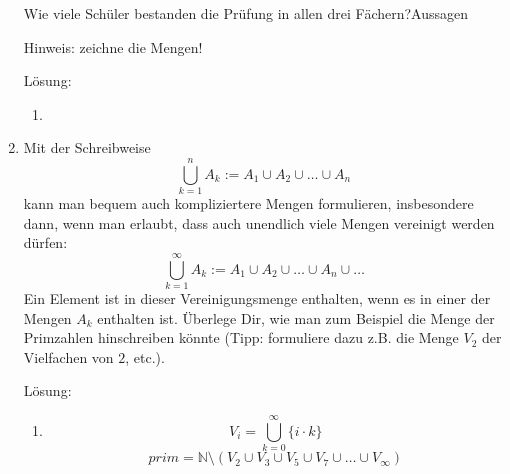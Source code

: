 \documentclass[main.tex]{subfiles}
\begin{document}
\begin{enumerate}
	      Wie viele Schüler bestanden die Prüfung in allen drei Fächern?Aussagen

	      Hinweis: zeichne die Mengen!

	      Lösung:
	      \begin{enumerate}
		      \item
	      \end{enumerate}
	\item Mit der Schreibweise
	      \[ \bigcup_{k = 1}^{n} A_k := A_1 \cup A_2 \cup \dots \cup A_n \]
	      kann man bequem auch kompliziertere Mengen formulieren, insbesondere dann, wenn man
	      erlaubt, dass auch unendlich viele Mengen vereinigt werden dürfen:
	      \[ \bigcup_{k = 1}^{\infty} A_k := A_1 \cup A_2 \cup \dots \cup A_n \cup \dots \]
	      Ein Element ist in dieser Vereinigungsmenge enthalten, wenn es in einer der Mengen \( A_k \) enthalten ist.
	      Überlege Dir, wie man zum Beispiel die Menge der Primzahlen hinschreiben könnte
	      (Tipp: formuliere dazu z.B. die Menge \( V_2 \) der Vielfachen von \( 2 \), etc.).

	      Lösung:
	      \begin{enumerate}
			\item 
			\[ V_i = \bigcup_{k = 0}^{\infty} \{i \cdot k\} \]
			\[ prim = \mathbb{N} \setminus (V_2 \cup V_3 \cup V_5 \cup V_7 \cup \dots \cup V_\infty)  \]
	      \end{enumerate}
\end{enumerate}
\end{document}
